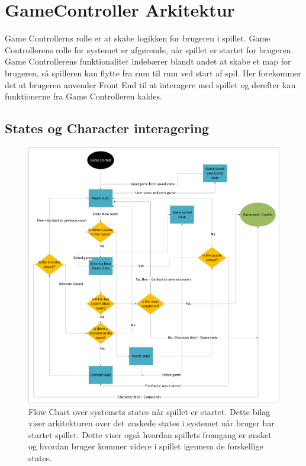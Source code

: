 \section{GameController Arkitektur}
Game Controllerns rolle er at skabe logikken for brugeren i spillet. Game Controllerens rolle for systemet er afgørende, når spillet er startet for brugeren. Game Controllerens funktionalitet indebærer blandt andet at skabe et map for brugeren, så spilleren kan flytte fra rum til rum ved start af spil. Her forekommer det at brugeren anvender Front End til at interagere med spillet og derefter kan funktionerne fra Game Controlleren kaldes.
\subsection{States og Character interagering}
\begin{figure}[h]
\centering
\includegraphics[width = \textwidth]{02-Body/Images/Arkitektur - State Logic.pdf}
\caption{Flow Chart over systemets states når spillet er startet. Dette bilag viser arkitekturen over det ønskede states i systemet når bruger har startet spillet. Dette viser også hvordan spillets fremgang er ønsket og hvordan bruger kommer videre i spillet igennem de forskellige states.}
\label{fig:Arkitektur-SD-SaveGame}
\end{figure}
